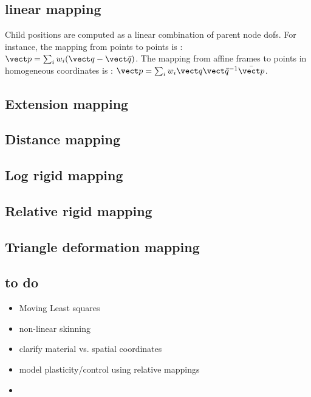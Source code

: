 \subsection{linear mapping}

Child positions are computed as a linear combination of parent node dofs.
For instance, the mapping from points to points is : $\p = \sum_i w_i (\vdof - \vdofinit)$.
The mapping from affine frames to points in homogeneous coordinates is : $\p = \sum_i w_i \vdof \vdofinit^{-1} \pinit$.

\subsection{Extension mapping}

\subsection{Distance mapping}

\subsection{Log rigid mapping}

\subsection{Relative rigid mapping}

\subsection{Triangle deformation mapping}

\subsection{to do}

\begin{itemize}
 \item Moving Least squares
 \item non-linear skinning
 \item clarify material vs. spatial coordinates
 \item model plasticity/control using relative mappings
 \item 
\end{itemize}





